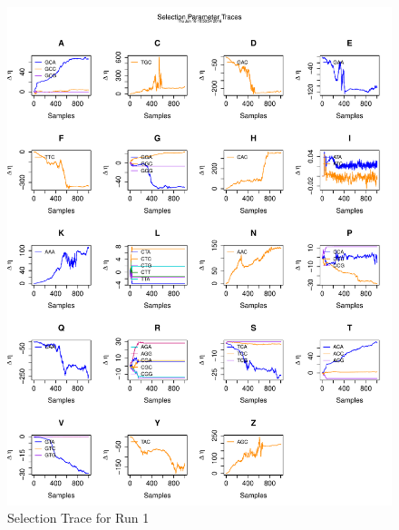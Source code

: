 \documentclass[11pt]{labbook}
\begin{document}
\begin{itemize}
\begin{figure}
            \includegraphics[scale=.65]{FONSE_Plots/2016/June_16/Run1_SelectionTrace}
            \caption{Selection Trace for Run 1}
            \label{fig:JUN16_SEL_R1}
        \end{figure}
        \begin{figure}
            \centering

\end{figure}
\end{itemize}
\end{document}
